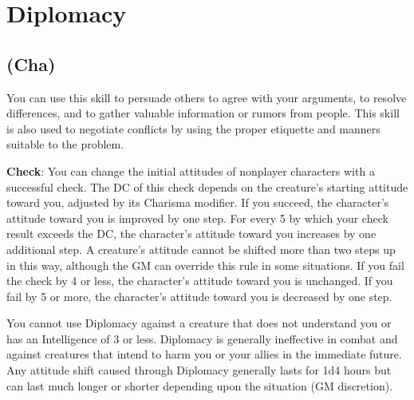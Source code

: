 \section{Diplomacy}

\label{f0}
\subsection{(Cha)}

				
You can use this skill to persuade others to agree with your arguments, to resolve differences, and to gather valuable information or rumors from people. This skill is also used to negotiate conflicts by using the proper etiquette and manners suitable to the problem.
				
\textbf{Check}: You can change the initial attitudes of nonplayer characters with a successful check. The DC of this check depends on the creature's starting attitude toward you, adjusted by its Charisma modifier. If you succeed, the character's attitude toward you is improved by one step. For every 5 by which your check result exceeds the DC, the character's attitude toward you increases by one additional step. A creature's attitude cannot be shifted more than two steps up in this way, although the GM can override this rule in some situations. If you fail the check by 4 or less, the character's attitude toward you is unchanged. If you fail by 5 or more, the character's attitude toward you is decreased by one step.
				
You cannot use Diplomacy against a creature that does not understand you or has an Intelligence of 3 or less. Diplomacy is generally ineffective in combat and against creatures that intend to harm you or your allies in the immediate future. Any attitude shift caused through Diplomacy generally lasts for 1d4 hours but can last much longer or shorter depending upon the situation (GM discretion).

